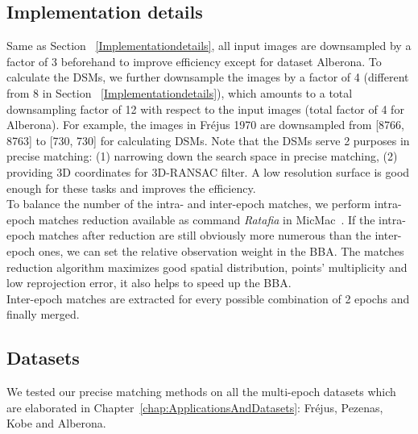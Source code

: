 \subsection{Implementation details}
Same as Section ~\ref{Implementationdetails}, all input images are downsampled by a factor of 3 beforehand to improve efficiency except for dataset Alberona. To calculate the DSMs, we further downsample the images by a factor of 4 (different from 8 in Section ~\ref{Implementationdetails}), which amounts to a total downsampling factor of 12 with respect to the input images (total factor of 4 for Alberona). For example, the images in Fr{\'e}jus 1970 are downsampled from [8766, 8763] to [730, 730] for calculating DSMs. 
Note that the DSMs serve 2 purposes in precise matching: (1) narrowing down the search space in precise matching, (2) providing 3D coordinates for 3D-RANSAC filter. A low resolution surface is good enough for these tasks and improves the efficiency.\\
To balance the number of the intra- and inter-epoch matches, we perform intra-epoch matches reduction available as command \textit{Ratafia} in MicMac~\cite{marc2016micmac}. %
If the intra-epoch matches after reduction are still obviously more numerous than the inter-epoch ones, we can set the relative observation weight in the \ac{BBA}. The matches reduction algorithm maximizes good spatial distribution, points' multiplicity and low reprojection error, it also helps to speed up the \ac{BBA}.\\
Inter-epoch matches are extracted {for every possible combination of 2 epochs and finally merged}.\\


\subsection{Datasets}
We tested our precise matching methods on all the multi-epoch datasets which are elaborated in Chapter~\ref{chap:ApplicationsAndDatasets}: Fr{\'e}jus, Pezenas, Kobe and Alberona.

